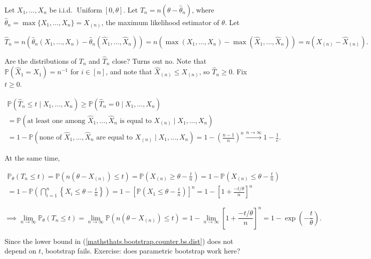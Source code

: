 \begin{example}

Let \(X_1, \ldots, X_n\) be i.i.d. \(\operatorname{Uniform}[0, \theta]\). Let \(T_n = n(\theta - \hat{\theta}_n)\), where \(\hat{\theta}_n = \max\{X_1, \ldots, X_n\}= X_{(n)}\), the maximum likelihood estimator of \(\theta\). Let

\[
\hat{T}_n = n( \hat{\theta}_n(X_1, \ldots, X_n)  - \hat{\theta}_n(\hat{X}_1, \ldots, \hat{X}_n)) = n (\max(X_1, \ldots, X_n) - \max( \hat{X}_1, \ldots, \hat{X}_n)) = n(X_{(n)} - \hat{X}_{(n)}).
\]

Are the distributions of \(T_n\) and \(\hat{T}_n\) close? Turns out no. Note that \(\mathbb{P}(\hat{X}_1 = X_1) = n^{-1}\) for \(i \in [n]\), and note that \(\hat{X}_{(n)} \leq X_{(n)}\), so \(\hat{T}_n \geq 0\). Fix \( t \geq 0\). 

\begin{multline}\label{mathsthats.bootstrap.counter.bs.dist}
\mathbb{P}(\hat{T}_n \leq t \mid X_1, \ldots, X_n) \geq \mathbb{P}(\hat{T}_n = 0 \mid X_1, \ldots, X_n)  
\\ = \mathbb{P}(\text{at least one among } \hat{X}_1, \ldots, \hat{X}_n \text{ is equal to } X_{(n)} \mid X_1, \ldots, X_n)
\\ = 1 -  \mathbb{P}(\text{none of } \hat{X}_1, \ldots, \hat{X}_n \text{ are equal to } X_{(n)} \mid X_1, \ldots, X_n) = 1 - \left(  \frac{n-1}{n}\right)^n \xrightarrow{n \to \infty} 1 - \frac{1}{e}.
\end{multline}

At the same time, 


\begin{multline}\label{mathstats.hw5.2.a.prob}
\mathbb{P}_\theta(T_n \leq t) = \mathbb{P} \left(n (\theta - X_{(n)}) \leq t \right) = \mathbb{P} \left( X_{(n)} \geq \theta - \frac{t}{n} \right) = 1 -  \mathbb{P} \left( X_{(n)} \leq \theta - \frac{t}{n} \right) 
\\ = 1 -  \mathbb{P} \left( \bigcap_{i=1}^n \left\{ X_{i} \leq \theta - \frac{t}{n} \right\} \right) 
 =  1 - \left[ \mathbb{P} \left( X_{1} \leq \theta - \frac{t}{n} \right) \right]^n = 1 - \left[ 1 + \frac{-t/\theta}{ n} \right]^n
\end{multline}

\[
\implies \lim_{n \to \infty} \mathbb{P}_\theta(T_n \leq t) = \lim_{n \to \infty} \mathbb{P} \left(n (\theta - X_{(n)}) \leq t \right) = 1 -  \lim_{n \to \infty} \left[ 1 + \frac{-t/\theta}{ n} \right]^n = 1 - \exp \left( - \frac{t}{\theta} \right).
\]

Since the lower bound in (\ref{mathsthats.bootstrap.counter.bs.dist}) does not depend on \(t\), bootstrap fails. Exercise: does parametric bootstrap work here?

\end{example}

